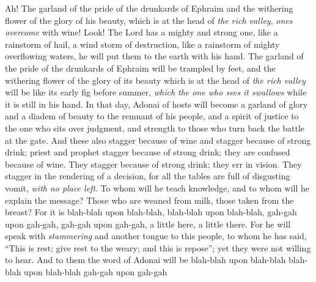 \begin{biblechapter} %
 Ah! The garland of the pride of the drunkards of Ephraim 
and the withering flower of the glory of his beauty, 
which is at the head of \textit{the rich valley}, 
\textit{ones overcome} with wine!
\verse Look! The Lord has a mighty and strong one, 
like a rainstorm of hail, a wind storm of destruction, 
like a rainstorm of mighty overflowing waters, 
he will put them to the earth with his hand.
\verse The garland of the pride of the drunkards of Ephraim 
will be trampled by feet,
\verse and the withering flower of the glory of its beauty 
which is at the head of \textit{the rich valley} 
will be like its early fig before summer, 
\textit{which the one who sees it swallows} while it is still in his hand.
\verse In that day, Adonai of hosts will become a garland of glory 
and a diadem of beauty to the remnant of his people,
\verse and a spirit of justice to the one who sits over judgment, 
and strength to those who turn back the battle at the gate.
\verse And these also stagger because of wine 
and stagger because of strong drink; 
priest and prophet stagger because of strong drink; 
they are confused because of wine. 
They stagger because of strong drink; 
they err in vision. 
They stagger in the rendering of a decision,
\verse for all the tables are full of disgusting vomit, \textit{with no place left}.
\verse To whom will he teach knowledge, 
and to whom will he explain the message? 
Those who are weaned from milk, 
those taken from the breast?
\verse For it is blah-blah upon blah-blah, 
blah-blah upon blah-blah, 
gah-gah upon gah-gah, 
gah-gah upon gah-gah, 
a little here, a little there.
\verse For he will speak with \textit{stammering} and another tongue to this people,
\verse to whom he has said, “This is rest; give rest to the weary; 
and this is repose”; yet they were not willing to hear.
\verse And to them the word of Adonai will be blah-blah upon blah-blah 
blah-blah upon blah-blah 
gah-gah upon gah-gah 

\end{biblechapter}
